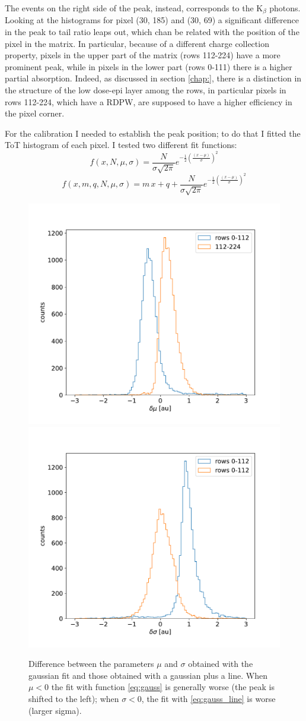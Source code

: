         The events on the right side of the peak, instead, corresponds to the K$_{\beta}$ photons. 
        Looking at the histograms for pixel (30, 185) and (30, 69) a significant difference in the peak to tail ratio leaps out, which chan be related with the position of the pixel in the matrix.
        In particular, because of a different charge collection property, pixels in the upper part of the matrix (rows 112-224) have a more prominent peak, while in pixels in the lower part (rows 0-111) there is a higher partial absorption.
        Indeed, as discussed in section \ref{chap:}, there is a distinction in the structure of the low dose-epi layer among the rows, in particular pixels in rows 112-224, which have a RDPW, are supposed to have a higher efficiency in the pixel corner. 
        
        For the calibration I needed to establish the peak position; to do that I fitted the ToT histogram of each pixel. I tested two different fit functions:  
        \begin{equation} \label{eq:gauss}
            f(x, N, \mu, \sigma) = \frac{N}{\sigma \sqrt{2\pi}} e^{-\frac{1}{2}(\frac{(x-\mu)}{\sigma})^2}
        \end{equation} 
        \begin{equation} \label{eq:gauss_line}
            f(x, m, q, N, \mu, \sigma) = m\,x + q + \frac{N}{\sigma \sqrt{2\pi}} e^{-\frac{1}{2}(\frac{(x-\mu)}{\sigma})^2}
        \end{equation}          
        \begin{figure}[h!]
            \centering
            \includegraphics[width=.49\linewidth]{figures/charaterization/deltam_Fe.pdf}
            \includegraphics[width=.49\linewidth]{figures/charaterization/deltas_Fe.pdf}
            \caption{Difference between the parameters $\mu$ and $\sigma$ obtained with the gaussian fit and those obtained with a gaussian plus a line. When $\mu<$0 the fit with function \ref{eq:gauss} is generally worse (the peak is shifted to the left); when $\sigma<0$, the fit with \ref{eq:gauss_line} is worse (larger sigma).}
            \label{fig:delta_fit}
        \end{figure}          
